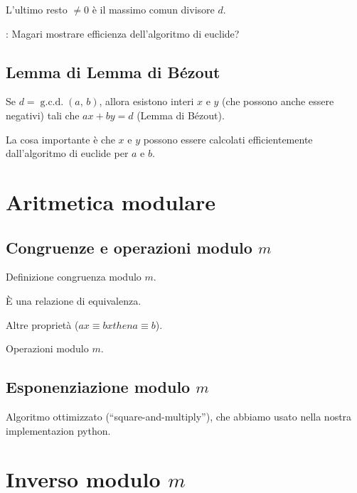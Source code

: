 \documentclass[pdflatex,11pt,a4paper,oneside]{article}
\newcommand{\then}[0]{then }
\newcommand{\XXX}[1][XXX]{\text{\bfseries{\color{red}{\emph{#1}}}}}
\newcommand{\TODO}[0]{\XXX[TODO]}
\newcommand{\congruent}[0]{\equiv}
\newcommand{\gcdop}[0]{\ensuremath{\operatorname{g.c.d.}}}
\newcommand{\xgcd}[1]{\ensuremath{\gcdop\left({#1}\right)}}
\renewcommand{\gcd}[2]{\xgcd{{#1},\,{#2}}}
\numberwithin{equation}{section}
\begin{document}
\noindent
L'ultimo resto $\neq 0$ \`e il massimo comun divisore $d$.

\noindent
\TODO: Magari mostrare efficienza dell'algoritmo di euclide?


\subsection{Lemma di Lemma di B\'ezout}

Se $d = \gcd{a}{b}$, allora esistono interi $x$ e $y$ (che possono 
anche essere negativi) tali che $ax + by = d$ (Lemma di B\'ezout).

La cosa importante \`e che $x$ e $y$ possono essere calcolati
efficientemente dall'algoritmo di euclide per $a$ e $b$.


\section{Aritmetica modulare}


\subsection{Congruenze e operazioni modulo $m$}

Definizione congruenza modulo $m$.

\`E una relazione di equivalenza.

Altre propriet\`a ($ax \congruent bx \then a \congruent b$).

Operazioni modulo $m$.


\subsection{Esponenziazione modulo $m$}

Algoritmo ottimizzato (``square-and-multiply''), che abbiamo usato nella
nostra implementazion python.


\section{Inverso modulo $m$}
\end{document}
